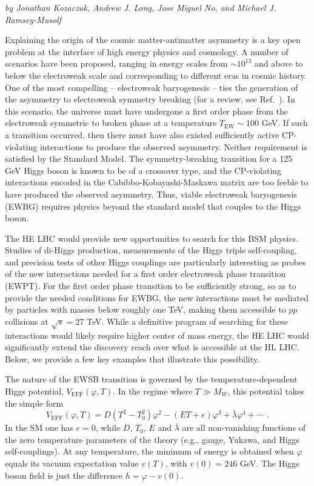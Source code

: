 \begin{center}
\textit{by Jonathan Kozaczuk, Andrew J. Long, Jose Miguel No, and Michael J. Ramsey-Musolf}
\end{center}

 Explaining the origin of the cosmic matter-antimatter asymmetry is a key open problem at the interface of high energy physics and cosmology. A number of scenarios have been proposed, ranging in energy scales from $\sim 10^{12}$ and above to below the electroweak scale and corresponding to different eras in cosmic history. One of the most compelling -- electroweak baryogenesis --  ties the generation of the asymmetry to electroweak symmetry breaking (for a review, see Ref.~\cite{Morrissey:2012db}). In this scenario, the universe must have undergone a first order phase from the electroweak symmetric to broken phase at a temperature $T_\mathrm{EW} \sim 100$ GeV. If such a transition occurred, then there must have also existed sufficiently active CP-violating interactions to produce the observed asymmetry. Neither requirement is satisfied by the Standard Model. The symmetry-breaking transition for a 125 GeV Higgs boson is known to be of a crossover type, and the CP-violating interactions encoded in the Cabibbo-Kobayashi-Maskawa matrix are too feeble to have produced the observed asymmetry. Thus, viable electroweak baryogenesis (EWBG) requires physics beyond the standard model that couples to the Higgs boson.

The HE LHC would provide new opportunities to search for this BSM physics. Studies of di-Higgs production, measurements of the Higgs triple self-coupling, and precision tests of other Higgs couplings are particularly interesting as probes of the new interactions needed for a first order electroweak phase transition (EWPT). For the first order phase transition to be sufficiently strong, so as to provide the needed conditions for EWBG, the new interactions must be mediated by particles with masses below roughly one TeV, making them accessible to $pp$ collisions at $\sqrt{s} = 27$ TeV. While a definitive program of searching for these interactions would likely require higher center of mass energy, the HE LHC would significantly extend the discovery reach over what is accessible at the HL LHC. Below, we provide a few key examples that illustrate this possibility.

 The nature of the EWSB transition is governed by the temperature-dependent Higgs potential, $V_\mathrm{EFF}(\varphi, T)$. In the regime where $T\gg M_W$, this potential takes the 
simple form
\begin{equation}
V_\mathrm{EFF}(\varphi,T) = D(T^2-T_0^2)\varphi^2 -(ET+e)\varphi^3 + {\bar\lambda}\varphi^4+\cdots ~~.
\label{eq:HiggspotT}
\end{equation}
In the SM one has $e=0$, while $D$, $T_0$, $E$ and ${\bar\lambda}$ are all non-vanishing functions of the zero temperature parameters of the theory (e.g., gauge, Yukawa, and Higgs self-couplings). At any temperature, the minimum of energy is obtained when $\varphi$ equals its vacuum expectation value $v(T)$, with $v(0) = 246$ GeV. The Higgs boson field is just the difference $h=\varphi-v(0)$. 

